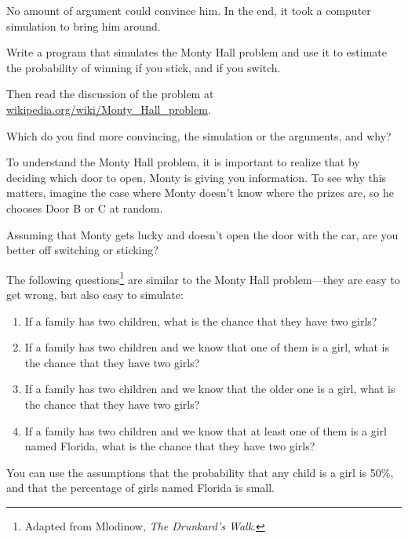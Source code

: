 \documentclass[10pt]{book}
\begin{document}
No amount of argument could convince him.  In the end, it took
a computer simulation to bring him around.

\begin{ex}

Write a program that simulates the Monty Hall problem and use
it to estimate the probability of winning if you stick, and if
you switch.

Then read the discussion of the problem at
\url{wikipedia.org/wiki/Monty_Hall_problem}.

Which do you find more convincing, the simulation or the arguments,
and why?

\end{ex}


\begin{ex}

To understand the Monty Hall problem, it is important to realize
that by deciding which door to open, Monty is giving you information.
To see why this matters, imagine the case where Monty doesn't
know where the prizes are, so he chooses Door B or C at random.

Assuming that Monty gets lucky and doesn't open the door with the
car, are you better off switching or sticking?

\end{ex}


\begin{ex}

The following questions\footnote{Adapted from
  Mlodinow, {\em The Drunkard's Walk}.} are similar to the Monty Hall
  problem---they are easy to get wrong, but also easy
  to simulate:

\begin{enumerate}

\item If a family has two children, what is the chance that they
  have two girls?

\item If a family has two children and we know that one of them is a
  girl, what is the chance that they have two girls?

\item If a family has two children and we know that the older one is a
  girl, what is the chance that they have two girls?

\item If a family has two children and we know that at least one of
  them is a girl named Florida, what is the chance that they have
  two girls?

\end{enumerate}

You can use the assumptions that the probability that any child
is a girl is 50\%, and that the percentage of girls named
Florida is small.

\end{ex}
\end{document}
